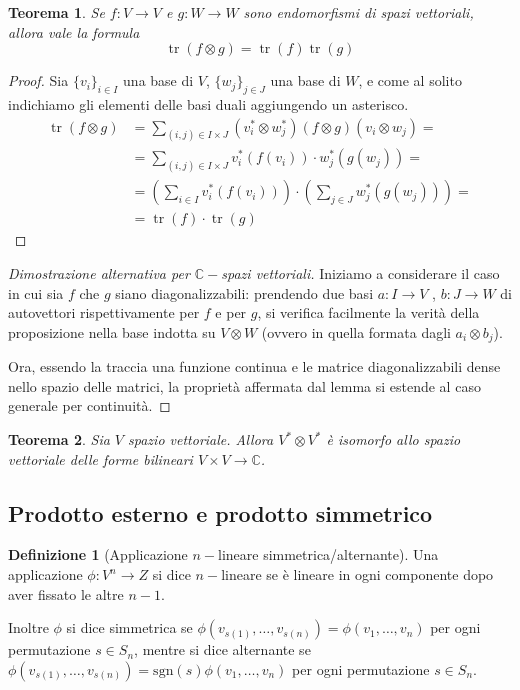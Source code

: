 \documentclass[11pt]{article}
\theoremstyle{plain}
\newtheorem{thm}{Teorema}[section]
\theoremstyle{definition}
\newtheorem{defn}{Definizione}[section]
\theoremstyle{remark}
\newcommand{\C}{\mathbb{C}}
\DeclareMathOperator{\tr}{tr}
\begin{document}
\begin{thm}
Se $f:V\to V$ e $g:W\to W$ sono endomorfismi di spazi vettoriali, allora vale la formula
\[\tr(f\otimes g) = \tr(f) \tr(g)  \]
\label{thm: tracciaprodotto}
\end{thm}
\begin{proof}
Sia $\{v_i\}_{i\in I}$ una base di $V$, $\{w_j\}_{j\in J}$ una base di $W$, e come al solito indichiamo gli elementi delle basi duali aggiungendo un asterisco.
\begin{align*}
 \tr(f\otimes g) &= \sum_{(i,j)\in I\times J} (v_i^*\otimes w_j^*) (f\otimes g)(v_i\otimes w_j) =\\
                 &= \sum_{(i,j)\in I\times J} v_i^*(f(v_i))\cdot w_j^*(g(w_j)) =\\
                 &= \left(\sum_{i\in I} v_i^*(f(v_i))\right) \cdot \left(\sum_{j\in J} w_j^*(g(w_j))\right) =\\
                 &= \tr(f) \cdot \tr(g)
\end{align*}
\end{proof}
\begin{proof}[Dimostrazione alternativa per $\C-$spazi vettoriali]
Iniziamo a considerare il caso in cui sia $f$ che $g$ siano diagonalizzabili: prendendo due basi $a:I\rightarrow V$ , $b:J\rightarrow W$ di autovettori rispettivamente per $f$ e per $g$, si verifica facilmente la verità della proposizione nella base indotta su $V\otimes W$ (ovvero in quella formata dagli $a_i\otimes b_j$).

Ora, essendo la traccia una funzione continua e le matrice diagonalizzabili dense nello spazio delle matrici, la proprietà affermata dal lemma si estende al caso generale per continuità.
\end{proof}

\begin{thm}
Sia $V$ spazio vettoriale. Allora $V^*\otimes V^*$ è isomorfo allo spazio vettoriale delle forme bilineari $V\times V\to \C$.
\end{thm}


\subsection{Prodotto esterno e prodotto simmetrico}

\begin{defn}[Applicazione $n-$lineare simmetrica/alternante]
 Una applicazione $\phi: V^n \to Z$ si dice $n-$lineare se è lineare in ogni componente dopo aver fissato le altre $n-1$.

 Inoltre $\phi$ si dice simmetrica se $\phi(v_{s(1)},\ldots,v_{s(n)})=\phi(v_1,\ldots,v_n)$ per ogni permutazione $s \in S_n$, mentre si dice 
 alternante se $\phi(v_{s(1)},\ldots,v_{s(n)})=\mathrm{sgn}(s)\phi(v_1,\ldots,v_n)$ per ogni permutazione $s \in S_n$.
\end{defn}
\end{document}
